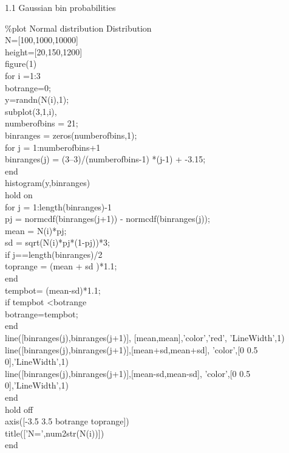 \documentclass[twoside,twocolumn]{article}
\begin{document}
\begin{large}
1.1 Gaussian bin probabilities
\end{large}
\newline
\begin{itshape}

\%plot Normal distribution  Distribution\\
N=[100,1000,10000]\\
height=[20,150,1200]\\
figure(1)\\

for i =1:3 \\
botrange=0;\\
y=randn(N(i),1);\\
subplot(3,1,i),\\
numberofbins = 21;\\
binranges = zeros(numberofbins,1);\\
for j = 1:numberofbins+1\\
    binranges(j) = (3--3)/(numberofbins-1) *(j-1) + -3.15;\\
end\\
histogram(y,binranges)\\
hold on\\
for j = 1:length(binranges)-1\\
    pj = normcdf(binranges(j+1)) - normcdf(binranges(j));\\
    mean = N(i)*pj;\\
    sd = sqrt(N(i)*pj*(1-pj))*3;\\
    if j==length(binranges)/2\\
        toprange = (mean + sd )*1.1;\\
    end\\
    tempbot= (mean-sd)*1.1;\\
    if tempbot <botrange\\
        botrange=tempbot;\\
    end\\
    line([binranges(j),binranges(j+1)],  [mean,mean],'color','red', 'LineWidth',1)\\
     line([binranges(j),binranges(j+1)],[mean+sd,mean+sd],
     'color',[0 0.5 0],'LineWidth',1)\\
    line([binranges(j),binranges(j+1)],[mean-sd,mean-sd],
    'color',[0 0.5 0],'LineWidth',1)\\
end\\
hold off  \\
axis([-3.5 3.5 botrange toprange])\\
title(['N=',num2str(N(i))])\\
end\\
\end{itshape}
\end{document}

